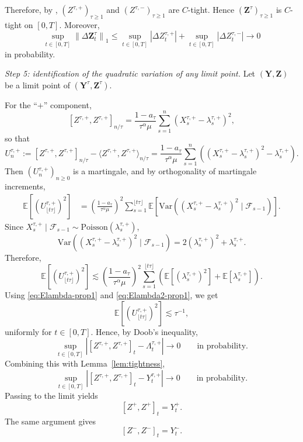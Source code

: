 \documentclass[letterpaper]{article}
\numberwithin{equation}{section}
\theoremstyle{definition}
\theoremstyle{remark}
\newcommand{\E}{\mathbb{E}}
\newcommand{\Var}{\mathrm{Var}}
\begin{document}
Therefore, by \cite[Proposition~12]{rebolledo1980central},
$(Z^{\tau,+})_{\tau\ge1}$ and $(Z^{\tau,-})_{\tau\ge1}$ are $C$-tight.
Hence $(\mathbf Z^\tau)_{\tau\ge1}$ is $C$-tight on $[0,T]$. Moreover,
\[
  \sup_{t\in[0,T]}\left\|\Delta \mathbf Z_t^\tau\right\|_1
  \le
  \sup_{t\in[0,T]}\left|\Delta Z_t^{\tau,+}\right|
  +
  \sup_{t\in[0,T]}\left|\Delta Z_t^{\tau,-}\right|
  \to 0
\]
in probability.

\medskip
\noindent
\textit{Step 5: identification of the quadratic variation of any limit point.}
Let $(\mathbf Y,\mathbf Z)$ be a limit point of $(\mathbf Y^\tau,\mathbf Z^\tau)$.

For the ``$+$'' component,
\[
  [Z^{\tau,+},Z^{\tau,+}]_{n/\tau}
  =
  \frac{1-a_\tau}{\tau^\alpha\mu}
  \sum_{s=1}^{n}(X_s^{\tau,+}-\lambda_s^{\tau,+})^2,
\]
so that
\[
  U_n^{\tau,+}
  :=
  [Z^{\tau,+},Z^{\tau,+}]_{n/\tau}
  -
  \langle Z^{\tau,+},Z^{\tau,+}\rangle_{n/\tau}
  =
  \frac{1-a_\tau}{\tau^\alpha\mu}
  \sum_{s=1}^{n}
  \left((X_s^{\tau,+}-\lambda_s^{\tau,+})^2-\lambda_s^{\tau,+}\right).
\]
Then $(U_n^{\tau,+})_{n\ge0}$ is a martingale, and by orthogonality of martingale
increments,
\begin{align*}
  \E\!\left[\left(U_{\lfloor t\tau\rfloor}^{\tau,+}\right)^2\right]
  &=
  \left(\frac{1-a_\tau}{\tau^\alpha\mu}\right)^2
  \sum_{s=1}^{\lfloor t\tau\rfloor}
  \E\!\left[
    \Var\!\left(
      (X_s^{\tau,+}-\lambda_s^{\tau,+})^2\mid\mathcal F_{s-1}
    \right)
  \right].
\end{align*}
Since $X_s^{\tau,+}\mid\mathcal F_{s-1}\sim\mathrm{Poisson}(\lambda_s^{\tau,+})$,
\[
  \Var\!\left((X_s^{\tau,+}-\lambda_s^{\tau,+})^2\mid\mathcal F_{s-1}\right)
  =
  2(\lambda_s^{\tau,+})^2+\lambda_s^{\tau,+}.
\]
Therefore,
\[
  \E\!\left[\left(U_{\lfloor t\tau\rfloor}^{\tau,+}\right)^2\right]
  \lesssim
  \left(\frac{1-a_\tau}{\tau^\alpha\mu}\right)^2
  \sum_{s=1}^{\lfloor t\tau\rfloor}
  \left(\E[(\lambda_s^{\tau,+})^2]+\E[\lambda_s^{\tau,+}]\right).
\]
Using \eqref{eq:Elambda-prop1} and \eqref{eq:Elambda2-prop1}, we get
\[
  \E\!\left[\left(U_{\lfloor t\tau\rfloor}^{\tau,+}\right)^2\right]
  \lesssim \tau^{-1},
\]
uniformly for $t\in[0,T]$. Hence, by Doob's inequality,
\[
  \sup_{t\in[0,T]}
  \left|
    [Z^{\tau,+},Z^{\tau,+}]_t-\Lambda_t^{\tau,+}
  \right|
  \to0
  \qquad\text{in probability.}
\]
Combining this with Lemma~\ref{lem:tightness},
\[
  \sup_{t\in[0,T]}
  \left|
    [Z^{\tau,+},Z^{\tau,+}]_t-Y_t^{\tau,+}
  \right|
  \to0
  \qquad\text{in probability.}
\]
Passing to the limit yields
\[
  [Z^+,Z^+]_t=Y_t^+.
\]
The same argument gives
\[
  [Z^-,Z^-]_t=Y_t^-.
\]
\end{document}
